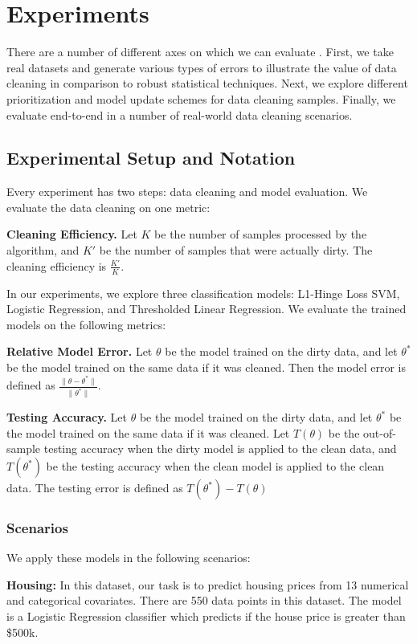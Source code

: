 \section{Experiments}
There are a number of different axes on which we can evaluate \sys.
First, we take real datasets and generate various types of errors to illustrate the value of data cleaning in comparison to robust statistical techniques.
Next, we explore different prioritization and model update schemes for data cleaning samples.
Finally, we evaluate \sys end-to-end in a number of real-world data cleaning scenarios.

\subsection{Experimental Setup and Notation}
Every experiment has two steps: data cleaning and model evaluation.
We evaluate the data cleaning on one metric:

\noindent\textbf{Cleaning Efficiency. } Let $K$ be the number of samples processed by the algorithm, and $K'$ be the number of samples that were actually dirty. The cleaning efficiency is $\frac{K'}{K}$.

In our experiments, we explore three classification models: L1-Hinge Loss SVM, Logistic Regression, and Thresholded Linear Regression.
We evaluate the trained models on the following metrics:

\noindent\textbf{Relative Model Error. } Let $\theta$ be the model trained on the dirty data, and let $\theta^*$ be the model trained on the same data if it was cleaned. Then the model error is defined as $\frac{\|\theta - \theta^*\|}{\|\theta^*\|}$.

\noindent\textbf{Testing Accuracy. } Let $\theta$ be the model trained on the dirty data, and let $\theta^*$ be the model trained on the same data if it was cleaned. Let $T(\theta)$ be the out-of-sample testing accuracy when the dirty model is applied to the clean data, and $T(\theta^*)$ be the testing accuracy when the clean model is applied to the clean data. The testing error is defined as $T(\theta^*) - T(\theta)$

\subsubsection{Scenarios}
We apply these models in the following scenarios:

\noindent\textbf{Housing: } In this dataset, our task is to predict housing prices from 13 numerical and categorical covariates. There are 550 data points in this dataset. The model is a Logistic Regression classifier which predicts if the house price is greater than \$500k.

